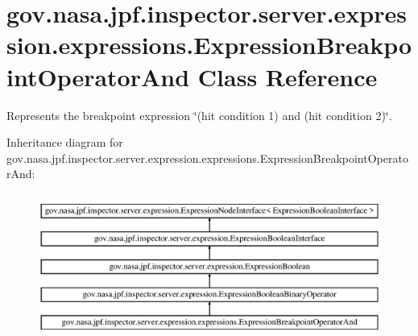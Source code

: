 \hypertarget{classgov_1_1nasa_1_1jpf_1_1inspector_1_1server_1_1expression_1_1expressions_1_1_expression_breakpoint_operator_and}{}\section{gov.\+nasa.\+jpf.\+inspector.\+server.\+expression.\+expressions.\+Expression\+Breakpoint\+Operator\+And Class Reference}
\label{classgov_1_1nasa_1_1jpf_1_1inspector_1_1server_1_1expression_1_1expressions_1_1_expression_breakpoint_operator_and}


Represents the breakpoint expression \char`\"{}(hit condition 1) and (hit condition 2)\char`\"{}.  


Inheritance diagram for gov.\+nasa.\+jpf.\+inspector.\+server.\+expression.\+expressions.\+Expression\+Breakpoint\+Operator\+And\+:\begin{figure}[H]
\begin{center}
\leavevmode
\includegraphics[height=4.827586cm]{classgov_1_1nasa_1_1jpf_1_1inspector_1_1server_1_1expression_1_1expressions_1_1_expression_breakpoint_operator_and}
\end{center}
\end{figure}
